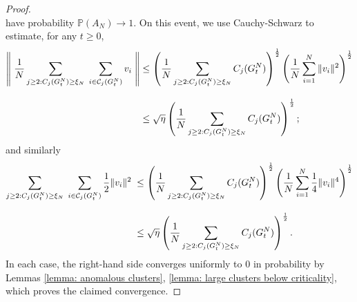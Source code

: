 \begin{proof}
\begin{equation}
    \end{equation} have probability $\mathbb{P}(A_N)\rightarrow 1$. On this event, we use Cauchy-Schwarz to estimate, for any $t\ge 0$, \begin{equation}\begin{split} \label{eq: use of CS 1}\left\|\hspace{0.1cm}\frac{1}{N}\sum_{j\geq 2: C_j(G^N_t)\geq \xi_N} \hspace{0.1cm}\sum_{i \in \mathcal{C}_j(G^N_t)} v_i \hspace{0.1cm}\right\| & \leq \left(\frac{1}{N}\sum_{j\geq 2: C_j(G^N_t)\geq \xi_N} C_j(G^N_t)\right)^\frac{1}{2}\left(\frac{1}{N}\sum_{i=1}^N \|v_i\|^2\right)^\frac{1}{2} \\[2ex] & \le  \sqrt{\eta}\left(\frac{1}{N}\sum_{j\geq 2: C_j(G^N_t)\geq \xi_N} C_j(G^N_t)\right)^\frac{1}{2}; \end{split} \end{equation} and similarly \begin{equation} \label{eq: use of CS 2} \begin{split} \sum_{j\geq 2: C_j(G^N_t)\geq \xi_N} \hspace{0.1cm}\sum_{i \in \mathcal{C}_j(G^N_t)} \frac{1}{2}\|v_i\|^2 \hspace{0.1cm} & \leq \left(\frac{1}{N}\sum_{j\geq 2: C_j(G^N_t)\geq \xi_N} C_j(G^N_t)\right)^\frac{1}{2}\left(\frac{1}{N}\sum_{i=1}^N \frac{1}{4}\|v_i\|^4\right)^\frac{1}{2} \\[2ex] & \leq \sqrt{\eta}\left(\frac{1}{N}\sum_{j\geq 2: C_j(G^N_t)\geq \xi_N} C_j(G^N_t)\right)^\frac{1}{2}. \end{split}\end{equation} In each case, the right-hand side converges uniformly to $0$ in probability by Lemmas \ref{lemma: anomalous clusters}, \ref{lemma: large clusters below criticality}, which proves the claimed convergence. \end{proof} 

